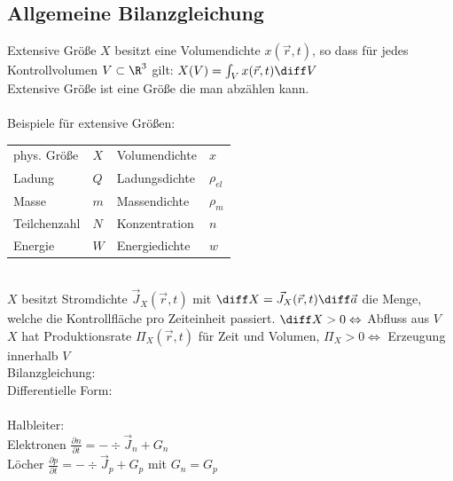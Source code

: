 \subsection{Allgemeine Bilanzgleichung}
Extensive Größe $X$ besitzt eine Volumendichte $x(\vec r,t)$, so dass für jedes Kontrollvolumen $V \subset \R^3$ gilt:
$X(V) = \int_V x(\vec r,t) \diff V$\\ %
Extensive Größe ist eine Größe die man abzählen kann.\\
\\
Beispiele für extensive Größen:\\
\begin{tabular*}{\columnwidth}{@{\extracolsep\fill}llll@{}} \mrule
    phys. Größe & $X$ & Volumendichte & $x$\\
    Ladung & $Q$ & Ladungsdichte & $\rho_{el}$\\
    Masse & $m$ & Massendichte & $\rho_m$\\
    Teilchenzahl & $N$ & Konzentration & $n$\\
    Energie & $W$ & Energiedichte & $w$\\
\end{tabular*}	\\
$X$ besitzt Stromdichte $\vec J_X(\vec r,t)$ mit $\diff X = \vec J_X(\vec r,t) \diff \vec a$ die Menge, welche die Kontrollfläche pro Zeiteinheit passiert. $\diff X > 0 \Leftrightarrow $ Abfluss aus $V$\\
$X$ hat Produktionsrate $\Pi_X(\vec r,t)$ für Zeit und Volumen, $\Pi_X > 0 \Leftrightarrow$ Erzeugung innerhalb $V$\\
Bilanzgleichung: \\
Differentielle Form: \\
\\
Halbleiter:\\
Elektronen $\frac{\partial n}{\partial t} = -\div \vec J_n + G_n$\\
Löcher $\frac{\partial p}{\partial t} = -\div \vec J_p + G_p$ mit $G_n = G_p$\\


